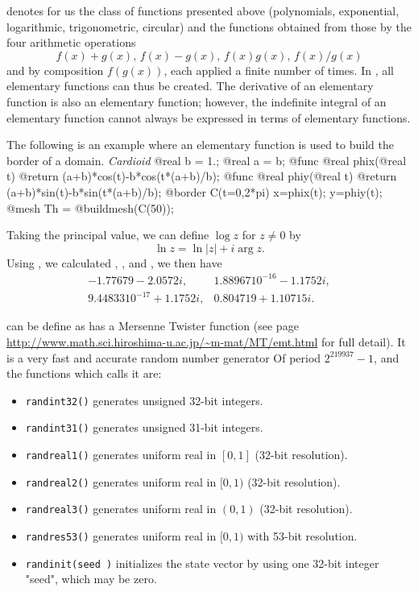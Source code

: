 \documentclass[a4paper,twoside,12pt]{book}
\begin{document}
\begin{description}
     

 denotes for us  the class of functions presented above
(polynomials, exponential, logarithmic, trigonometric, circular) and
the functions obtained from those by the four arithmetic operations
\[
f(x)+g(x),\, f(x)-g(x),\, f(x)g(x),\, f(x)/g(x)
\]
and by composition $f(g(x))$, each applied a finite number of times.
In \freefempp,  all elementary functions can thus be created.
The derivative of an elementary function is also an elementary function;
however, the indefinite integral of an elementary function cannot always be expressed in terms of elementary functions.
\begin{example}
The following is an example
where an  elementary function is used to build the border of a domain.
\emph{Cardioid}
\bFF
@real b = 1.;
@real a = b;
@func @real phix(@real t)
{
   @return (a+b)*cos(t)-b*cos(t*(a+b)/b);
}
@func @real phiy(@real t)
{
   @return (a+b)*sin(t)-b*sin(t*(a+b)/b);
}
@border C(t=0,2*pi) { x=phix(t); y=phiy(t); }
@mesh Th = @buildmesh(C(50));
\eFF
\end{example}
Taking the principal value, we can define $\log z$ for $z\neq 0$ by
\[
\ln z = \ln |z|+i \arg z.
\]
Using \freefempp, we calculated
, ,  and , we then have
\begin{eqnarray*}
-1.77679-2.0572i,& 1.88967 10^{-16}-1.1752i,\\
9.44833 10^{-17}+1.1752i, & 0.804719+1.10715i.
\end{eqnarray*}

 can be define as \freefempp has a Mersenne Twister function (see page \url{http://www.math.sci.hiroshima-u.ac.jp/~m-mat/MT/emt.html}
for full detail).
It is a very fast  and accurate random number generator
Of period $2^{219937}-1$, and the functions which calls it are:
\begin{itemize}
\item {\verb!randint32()!}  generates unsigned 32-bit integers.
\item {\verb!randint31()!} generates unsigned 31-bit integers.
\item {\verb!randreal1()!} generates uniform real in $[0,1]$ (32-bit resolution).
\item {\verb!randreal2()!} generates uniform real in $[0,1)$ (32-bit resolution).
\item {\verb!randreal3()!} generates uniform real in $(0,1)$ (32-bit resolution).
\item {\verb!randres53()!} generates uniform real in $[0,1)$ with 53-bit resolution.
\item {\verb!randinit(seed )!} initializes the state vector by using one  32-bit integer "seed", which may be zero.
\end{itemize}


\end{description}
\end{document}
